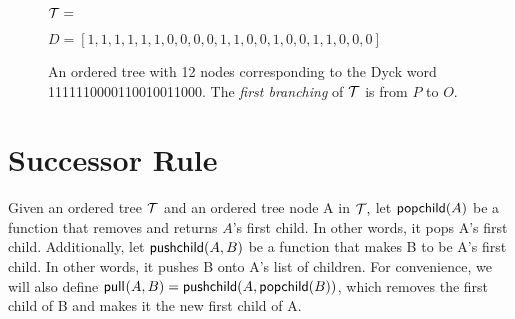 

\begin{figure}
    \centering
    $\mathcal{T}=$


    $D=[1, 1, 1, 1, 1, 1, 0, 0, 0, 0, 1, 1, 0, 0, 1, 0, 0, 1, 1, 0, 0, 0]$
    \caption[An ordered tree with 12 nodes corresponding to the Dyck word 1111110000110010011000.]{An ordered tree with 12 nodes corresponding to the Dyck word 1111110000110010011000.  The \emph{first branching} of $\mathcal{T}$ is from $P$ to $O$.}
    \label{fig:exampleotree}
\end{figure}


\section{Successor Rule} \label{sec:otree-successor}

Given an ordered tree $\mathcal{T}$ and an ordered tree node A in $\mathcal{T},$ let $\mathsf{popchild(} A \mathsf{)}$ be a function that removes and returns $A$'s first child.  In other words, it pops A's first child.  Additionally, let $\mathsf{pushchild(} A, B \mathsf{)}$ be a function that makes B to be A's first child.  In other words, it pushes B onto A's list of children. 
For convenience, we will also define $\mathsf{pull}_{}(A,B)=\mathsf{pushchild(} A, \mathsf{popchild(} B \mathsf{)} \mathsf{)}$, which removes the first child of B and makes it the new first child of A.

